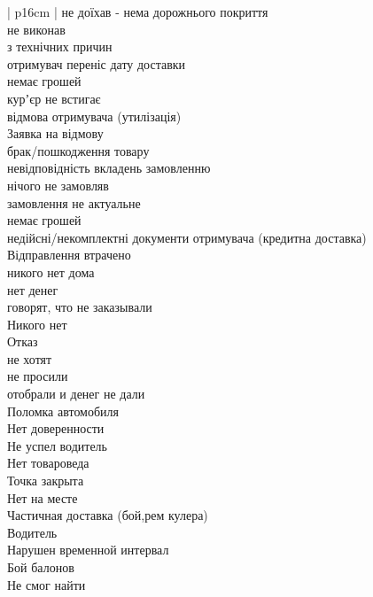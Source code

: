 \begin{mytable*}{ | p{16cm} | }
	\nopagebreak\quad не доїхав - нема дорожнього покриття \\
	\nopagebreak\quad не виконав \\
	\nopagebreak\quad з технічних причин \\
	\nopagebreak\quad отримувач переніс дату доставки \\
	\nopagebreak\quad немає грошей \\
	\nopagebreak\quad курʼєр не встигає \\
	\nopagebreak\quad відмова отримувача (утилізація) \\
	\hline
	Заявка на відмову \\
	\nopagebreak\quad брак/пошкодження товару \\
	\nopagebreak\quad невідповідність вкладень замовленню \\
	\nopagebreak\quad нічого не замовляв \\
	\nopagebreak\quad замовлення не актуальне \\
	\nopagebreak\quad немає грошей \\
	\nopagebreak\quad недійсні/некомплектні документи отримувача (кредитна доставка) \\
	\hline
	Відправлення втрачено \\
	\hline
	никого нет дома \\
	\hline
	нет денег \\
	\hline
	говорят, что не заказывали \\
	\hline
	Никого нет \\
	\hline
	Отказ \\
	\hline
	не хотят \\
	\hline
	не просили \\
	\hline
	отобрали и денег не дали \\
	\hline
	Поломка автомобиля \\
	\hline
	Нет доверенности \\
	\hline
	Не успел водитель \\
	\hline
	Нет товароведа \\
	\hline
	Точка закрыта \\
	\hline
	Нет на месте \\
	\hline
	Частичная доставка (бой,рем кулера) \\
	\hline
	Водитель \\
	\nopagebreak\quad Нарушен временной интервал \\
	\nopagebreak\quad Бой балонов \\
	\nopagebreak\quad Не смог найти \\

\end{mytable*}
